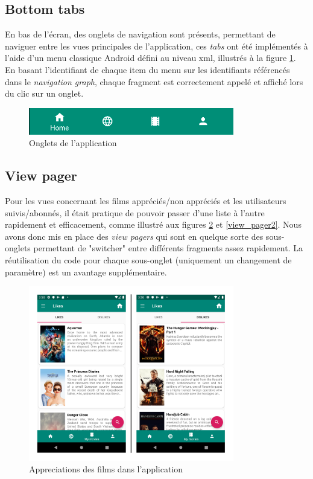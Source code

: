 \subsection{Bottom tabs}
En bas de l'écran, des onglets de navigation sont présents, permettant de naviguer entre les vues principales de l'application, ces \textit{tabs} ont été implémentés à l'aide d'un menu classique Android défini au niveau \acrshort{xml}, illustrés à la figure \ref{tabs}. En basant l'identifiant de chaque item du menu sur les identifiants référencés dans le \textit{navigation graph}, chaque fragment est correctement appelé et affiché lors du clic sur un onglet.
\begin{figure}
    \begin{center}
        \includegraphics[width=0.8\textwidth]{img/screenshots/Bottom_Tabs.png}
    \end{center}
    \caption{Onglets de l'application}
    \label{tabs}
\end{figure}

\subsection{View pager}

Pour les vues concernant les films appréciés/non appréciés et les utilisateurs suivis/abonnés, il était pratique de pouvoir passer d'une liste à l'autre rapidement et efficacement, comme illustré aux figures \ref{view_pager1} et \ref{view_pager2}. Nous avons donc mis en place des \textit{view pagers} qui sont en quelque sorte des sous-onglets permettant de "switcher" entre différents fragments assez rapidement. La réutilisation du code pour chaque sous-onglet (uniquement un changement de paramètre) est un avantage supplémentaire.
\begin{figure}
    \begin{center}
        \includegraphics[width=0.8\textwidth]{img/screenshots/ViewPager1.png}
    \end{center}
    \caption{Appreciations des films dans l'application}
    \label{view_pager1}
\end{figure}

